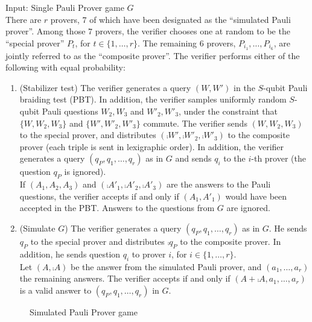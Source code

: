 \begin{center}
\begin{mdframed}
    Input: Single Pauli Prover game $G$ \\
		There are $r$ provers, $7$ of which have been designated as the ``simulated Pauli prover''. Among those $7$ provers, the verifier chooses one at random to be the ``special prover'' $P_t$, for $t\in\{1,\ldots,r\}$. The remaining $6$ provers, $P_{i_1},\ldots,P_{i_6}$, are jointly referred to as the ``composite prover''. The verifier performs either of the following with equal probability: 
	\begin{enumerate}
		\item (Stabilizer test) The verifier generates a query $(W,W')$ in the $S$-qubit Pauli braiding test (PBT). In addition, the verifier samples uniformly random $S$-qubit Pauli questions $W_2,W_3$ and $W'_2,W'_3$, under the constraint that $\{W,W_2,W_3\}$ and $\{W',W'_2,W'_3\}$ commute. The verifier sends $(W,W_2,W_3)$ to the special prover, and distributes $(\comp{W'},\comp{W'_2},\comp{W'_3})$ to the composite prover (each triple is sent in lexigraphic order). In addition, the verifier generates a query $(q_P,q_1,\ldots,q_r)$ as in $G$ and sends $q_i$ to the $i$-th prover (the question $q_P$ is ignored). \\
		If $(A_1,A_2,A_3)$ and $(\comp{A'_1},\comp{A'_2},\comp{A'_3})$ are the answers to the Pauli questions, the verifier accepts if and only if $(A_1,A'_1)$ would have been accepted in the PBT. Answers to the questions from $G$ are ignored.  
		\item (Simulate $G$) The verifier generates a query $(q_P,q_1,\ldots,q_r)$ as in $G$. He sends $q_P$ to the special prover and distributes $\comp{q_P}$ to the composite prover. In addition, he sends question $q_i$ to prover $i$, for $i\in\{1,\ldots,r\}$.\\
		Let $(A,\comp{A})$ be the answer from the simulated Pauli prover, and $(a_1,\ldots,a_r)$ the remaining answers. The verifier accepts if and only if $(A+\comp{A},a_1,\ldots,a_r)$ is a valid answer to $(q_P,q_1,\ldots,q_r)$ in $G$.
	\end{enumerate}    
\end{mdframed}
\end{center}
\begin{figure}[H]
\caption{Simulated Pauli Prover game}
\label{fig:simpauli_check}
\end{figure}

